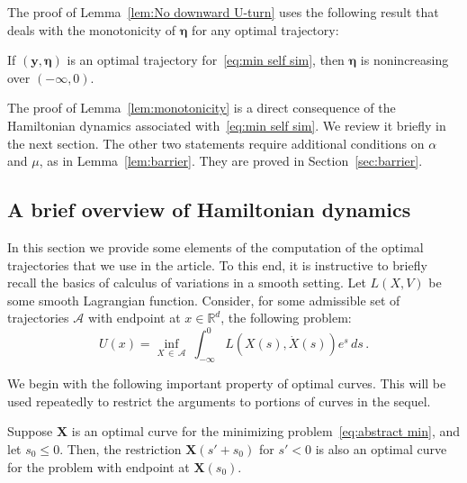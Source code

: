 \documentclass[AHL,Unicode,longabstracts]{cedram}
\newcommand{\R}{\mathbb{R}}
\newcommand{\bX}{\mathbf{X}}
\newcommand{\by}{\mathbf{y}}
\newcommand{\mA}{\mathcal{A}}
\newcommand{\beeta}{\boldsymbol{\eta}}
\newcommand{\1}{\mathds{1}}
\begin{document}
The proof of Lemma~\ref{lem:No downward U-turn} uses the following result that deals with the monotonicity of $\beeta$ for any optimal trajectory:

\begin{lemm}[Monotonicity of $\beeta$]\label{lem:monotonicity}
If $(\by,\beeta)$ is an optimal trajectory for~\eqref{eq:min self sim}, then $\beeta$ is nonincreasing over $(-\infty,0)$.
\end{lemm}



The proof of Lemma~\ref{lem:monotonicity} is a direct consequence of the Hamiltonian dynamics associated with~\eqref{eq:min self sim}. We review it briefly in the next section. The other two statements require additional conditions on $\alpha$ and $\mu$, as in Lemma~\ref{lem:barrier}. They are proved in Section~\ref{sec:barrier}.



\subsection{A brief overview of Hamiltonian dynamics}\label{sec:hamiltonian}

In this section we provide some elements of the computation of the optimal trajectories that we use in the article. To this end, it is instructive to briefly recall the basics of calculus of variations in a smooth setting. Let $L(X,V)$ be some smooth Lagrangian function. Consider, for some admissible set of trajectories $\mA$ with endpoint at $x\in \R^d$, the following problem:
\begin{equation}\label{eq:abstract min}
U(x)= \inf_{X\,\in\,\mA}\ \int_{-\infty}^0 L\left(X(s),\dot X(s)\right) e^s\, ds\,.
\end{equation}


We begin with the following important property of optimal curves. This will be used repeatedly to restrict the arguments to portions of curves in the sequel.

\begin{lemm}
Suppose $\bX$ is an optimal curve for the minimizing problem~\eqref{eq:abstract min}, and let $s_0\leq 0$. Then, the restriction $\bX(s'+s_0)$ for $s'<0$ is also an optimal curve for the problem with endpoint at $\bX(s_0)$.\label{lem:XX}
\end{lemm}
\end{document}
